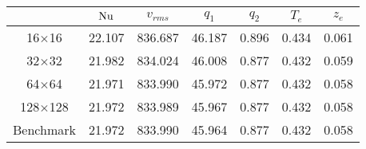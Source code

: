 \begin{tabular}{c|cccccc}
    & $\mathrm{Nu}$ & $v_{rms}$ & $q_1$ & $q_2$ & $T_{e}$ & $z_{e}$ \\
\hline
16$\times$16 & 22.107 & 836.687 & 46.187 & 0.896 & 0.434 & 0.061 \\
32$\times$32 & 21.982 & 834.024 & 46.008 & 0.877 & 0.432 & 0.059 \\
64$\times$64 & 21.971 & 833.990 & 45.972 & 0.877 & 0.432 & 0.058 \\
128$\times$128 & 21.972 & 833.989 & 45.967 & 0.877 & 0.432 & 0.058 \\
\hline
Benchmark & 21.972 & 833.990 & 45.964 & 0.877 & 0.432 & 0.058 \\
\end{tabular}
